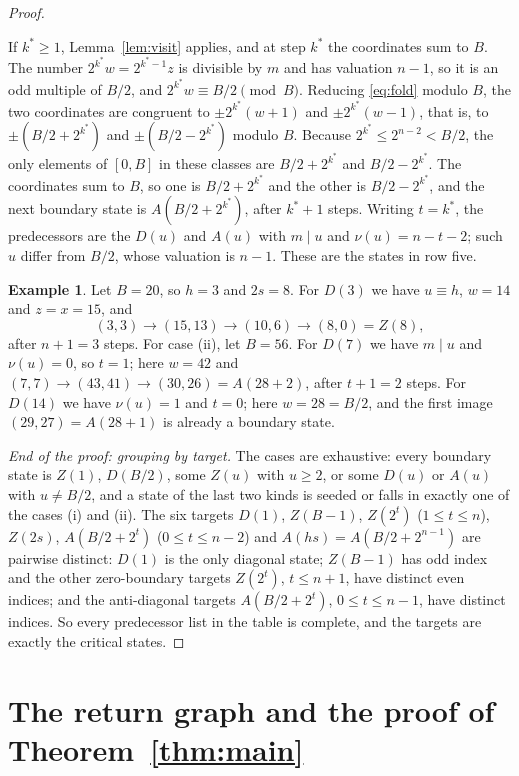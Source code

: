 \documentclass[11pt]{amsart}
\theoremstyle{definition}
\newtheorem*{example}{Example}
\theoremstyle{remark}
\newcommand{\vt}{\nu}
\begin{document}
\begin{proof}
\begin{itemize}
If $k^*\ge1$, Lemma~\ref{lem:visit} applies, and at step $k^*$ the coordinates sum to $B$. The number $2^{k^*}w=2^{k^*-1}z$ is divisible by $m$ and has valuation $n-1$, so it is an odd multiple of $B/2$, and $2^{k^*}w\equiv B/2\pmod B$. Reducing \eqref{eq:fold} modulo $B$, the two coordinates are congruent to $\pm2^{k^*}(w+1)$ and $\pm2^{k^*}(w-1)$, that is, to $\pm(B/2+2^{k^*})$ and $\pm(B/2-2^{k^*})$ modulo $B$. Because $2^{k^*}\le2^{n-2}<B/2$, the only elements of $[0,B]$ in these classes are $B/2+2^{k^*}$ and $B/2-2^{k^*}$. The coordinates sum to $B$, so one is $B/2+2^{k^*}$ and the other is $B/2-2^{k^*}$, and the next boundary state is $A(B/2+2^{k^*})$, after $k^*+1$ steps. Writing $t=k^*$, the predecessors are the $D(u)$ and $A(u)$ with $m\mid u$ and $\vt(u)=n-t-2$; such $u$ differ from $B/2$, whose valuation is $n-1$. These are the states in row five.
\end{itemize}

\begin{example}
Let $B=20$, so $h=3$ and $2s=8$. For $D(3)$ we have $u\equiv h$, $w=14$ and $z=x=15$, and
\[
(3,3)\to(15,13)\to(10,6)\to(8,0)=Z(8),
\]
after $n+1=3$ steps. For case (ii), let $B=56$. For $D(7)$ we have $m\mid u$ and $\vt(u)=0$, so $t=1$; here $w=42$ and $(7,7)\to(43,41)\to(30,26)=A(28+2)$, after $t+1=2$ steps. For $D(14)$ we have $\vt(u)=1$ and $t=0$; here $w=28=B/2$, and the first image $(29,27)=A(28+1)$ is already a boundary state.
\end{example}

\emph{End of the proof: grouping by target.} The cases are exhaustive: every boundary state is $Z(1)$, $D(B/2)$, some $Z(u)$ with $u\ge2$, or some $D(u)$ or $A(u)$ with $u\ne B/2$, and a state of the last two kinds is seeded or falls in exactly one of the cases (i) and (ii).
The six targets $D(1)$, $Z(B-1)$, $Z(2^t)$ ($1\le t\le n$), $Z(2s)$, $A(B/2+2^t)$ ($0\le t\le n-2$) and $A(hs)=A(B/2+2^{n-1})$ are pairwise distinct: $D(1)$ is the only diagonal state; $Z(B-1)$ has odd index and the other zero-boundary targets $Z(2^t)$, $t\le n+1$, have distinct even indices; and the anti-diagonal targets $A(B/2+2^t)$, $0\le t\le n-1$, have distinct indices. So every predecessor list in the table is complete, and the targets are exactly the critical states.
\end{proof}

\section{The return graph and the proof of Theorem~\ref{thm:main}}
\end{document}
